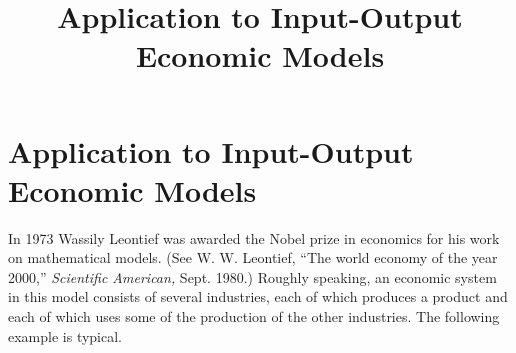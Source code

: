 \documentclass{ximera}
\title{Application to Input-Output Economic Models} \license{CC BY-NC-SA 4.0}
\begin{document}
\begin{abstract}
\end{abstract}
\maketitle

\section*{Application to Input-Output Economic Models}
In 1973 Wassily Leontief was awarded the Nobel prize in economics for his work on mathematical models.  (See W. W. Leontief, ``The world economy of the year 2000,'' \textit{Scientific American,} Sept. 1980.) Roughly speaking, an economic system in this model consists of several industries, each of which produces a product and each of which uses some of the production of the other industries. The following example is typical.
\end{document}
